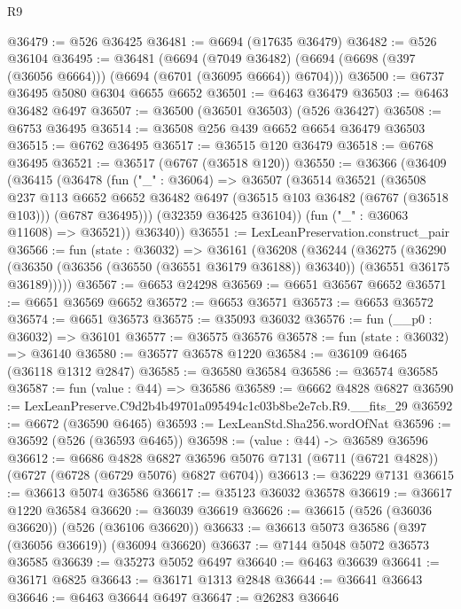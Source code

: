 \begin{lexlean}{R9}
\begin{coremodule}
@36479 := @526 @36425
@36481 := @6694 (@17635 @36479)
@36482 := @526 @36104
@36495 := @36481
    (@6694
      (@7049 @36482)
      (@6694 (@6698 (@397 (@36056 @6664))) (@6694 (@6701 (@36095 @6664)) @6704)))
@36500 := @6737 @36495 @5080 @6304 @6655 @6652
@36501 := @6463 @36479
@36503 := @6463 @36482 @6497
@36507 := @36500 (@36501 @36503) (@526 @36427)
@36508 := @6753 @36495
@36514 := @36508 @256 @439 @6652 @6654 @36479 @36503
@36515 := @6762 @36495
@36517 := @36515 @120 @36479
@36518 := @6768 @36495
@36521 := @36517 (@6767 (@36518 @120))
@36550 := @36366
    (@36409
      (@36415
        (@36478
          (fun ("_" : @36064) =>
          @36507
            (@36514
              @36521
              (@36508
                @237
                @113
                @6652
                @6652
                @36482
                @6497
                (@36515 @103 @36482 (@6767 (@36518 @103)))
                (@6787 @36495)))
            (@32359 @36425 @36104))
          (fun ("_" : @36063 @11608) => @36521))
        @36340))
@36551 := LexLeanPreservation.construct_pair
@36566 := fun (state : @36032) =>
  @36161
    (@36208
      (@36244
        (@36275
          (@36290
            (@36350 (@36356 (@36550 (@36551 @36179 @36188)) @36340))
            (@36551 @36175 @36189)))))
@36567 := @6653 @24298
@36569 := @6651 @36567 @6652
@36571 := @6651 @36569 @6652
@36572 := @6653 @36571
@36573 := @6653 @36572
@36574 := @6651 @36573
@36575 := @35093 @36032
@36576 := fun (__p0 : @36032) => @36101
@36577 := @36575 @36576
@36578 := fun (state : @36032) => @36140
@36580 := @36577 @36578 @1220
@36584 := @36109 @6465 (@36118 @1312 @2847)
@36585 := @36580 @36584
@36586 := @36574 @36585
@36587 := fun (value : @44) => @36586
@36589 := @6662 @4828 @6827
@36590 := LexLeanPreserve.C9d2b4b49701a095494c1c03b8be2e7cb.R9.__fits_29
@36592 := @6672 (@36590 @6465)
@36593 := LexLeanStd.Sha256.wordOfNat
@36596 := @36592 (@526 (@36593 @6465))
@36598 := (value : @44) -> @36589 @36596
@36612 := @6686
    @4828
    @6827
    @36596
    @5076
    @7131
    (@6711 (@6721 @4828))
    (@6727 (@6728 (@6729 @5076) @6827 @6704))
@36613 := @36229 @7131
@36615 := @36613 @5074 @36586
@36617 := @35123 @36032 @36578
@36619 := @36617 @1220 @36584
@36620 := @36039 @36619
@36626 := @36615 (@526 (@36036 @36620)) (@526 (@36106 @36620))
@36633 := @36613 @5073 @36586 (@397 (@36056 @36619)) (@36094 @36620)
@36637 := @7144 @5048 @5072 @36573 @36585
@36639 := @35273 @5052 @6497
@36640 := @6463 @36639
@36641 := @36171 @6825
@36643 := @36171 @1313 @2848
@36644 := @36641 @36643
@36646 := @6463 @36644 @6497
@36647 := @26283 @36646

\end{coremodule}
\end{lexlean}
